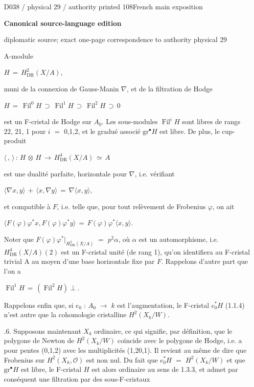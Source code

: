 \documentclass[9pt]{article}
\newcommand{\CanonText}[1]{\par{\fontsize{8.0}{9.35}\selectfont\RaggedRight #1\par}\vspace{2.2pt}}
\newcommand{\CanonDisplay}[1]{\par\vspace{1.2pt}\begin{center}{\fontsize{7.2}{8.4}\selectfont\(\displaystyle #1\)}\end{center}\vspace{1.2pt}}
\newcommand{\LayerTitle}{Canonical source-language edition}
\begin{document}
\noindent\begin{minipage}[t][\dimexpr\textheight-5pt\relax][t]{\textwidth}
{\sffamily\fontsize{7.3}{8.2}\selectfont\color{Quiet} D038 / physical 29 / authority printed 108\hfill French main exposition}
\par{}\vspace{4.5pt}
{\sffamily\fontsize{10.4}{11.6}\selectfont\bfseries\color{Accent} \LayerTitle}
\par{\sffamily\fontsize{6.7}{7.7}\selectfont\color{Quiet} diplomatic source; exact one-page correspondence to authority physical 29}
\vspace{5pt}
\CanonText{A-module}
\CanonDisplay{H\,=\,H^{2}_{\mathrm{DR}}(X/A),}
\CanonText{muni de la connexion de Gauss-Manin \(\nabla{}\), et de la filtration de Hodge}
\CanonDisplay{H\,=\,\operatorname{Fil}^{0}H\,\supset{}\,\operatorname{Fil}^{1}H\,\supset{}\,\operatorname{Fil}^{2}H\,\supset{}\,0}
\CanonText{est un F-cristal de Hodge sur \(A_{0}\). Les sous-modules \(\operatorname{Fil}^{i}H\) sont libres de rangs 22, 21, 1 pour \(i\) \(=\) 0,1,2, et le gradué associé \(\text{gr}^\bullet{}H\) est libre. De plus, le cup-produit}
\CanonDisplay{\langle{}\,,\,\rangle{}\,:\,H\,\otimes{}\,H\,\to{}\,H^{4}_{\mathrm{DR}}(X/A)\,\simeq{}\,A}
\CanonText{est une dualité parfaite, horizontale pour \(\nabla{}\), i.e. vérifiant}
\CanonDisplay{\langle{}\nabla{}x,y\rangle{}\,+\,\langle{}x,\nabla{}y\rangle{}\,=\,\nabla{}\langle{}x,y\rangle{},}
\CanonText{et compatible à \(F\), i.e. telle que, pour tout relèvement de Frobenius \(\varphi{}\), on ait}
\CanonDisplay{\langle{}F(\varphi{})\varphi{}^{*}x,F(\varphi{})\varphi{}^{*}y\rangle{}\,=\,F(\varphi{})\varphi{}^{*}\langle{}x,y\rangle{}.}
\CanonText{Noter que \(F(\varphi{})\varphi{}^{*}|_{H^{4}_{\mathrm{DR}}(X/A)}\) \(=\) \(p^{2}\alpha{}\), où \(\alpha{}\) est un automorphisme, i.e. \(H^{4}_{\mathrm{DR}}(X/A)(2)\) est un F-cristal unité (de rang 1), qu'on identifiera au F-cristal trivial A au moyen d'une base horizontale fixe par \(F\). Rappelons d'autre part que l'on a}
\CanonDisplay{\operatorname{Fil}^{1}H\,=\,(\operatorname{Fil}^{2}H)\perp{}.}
\CanonText{Rappelons enfin que, si \(e_{0}\) : \(A_{0}\) \(\to{}\) \(k\) est l'augmentation, le F-cristal \(e_{0}^{*}H\) (1.1.4) n'est autre que la cohomologie cristalline \(H^{2}(X_{k}/W)\).}
\CanonText{2.1.6. Supposons maintenant \(X_{k}\) ordinaire, ce qui signifie, par définition, que le polygone de Newton de \(H^{2}(X_{k}/W)\) coïncide avec le polygone de Hodge, i.e. a pour pentes (0,1,2) avec les multiplicités (1,20,1). Il revient au même de dire que Frobenius sur \(H^{2}(X_{k},\mathcal{O})\) est non nul. Du fait que \(e_{0}^{*}H\) \(=\) \(H^{2}(X_{k}/W)\) et que \(\text{gr}^\bullet{}H\) est libre, le F-cristal \(H\) est alors ordinaire au sens de 1.3.3, et admet par conséquent une filtration par des sous-F-cristaux}

\end{minipage}
\end{document}
